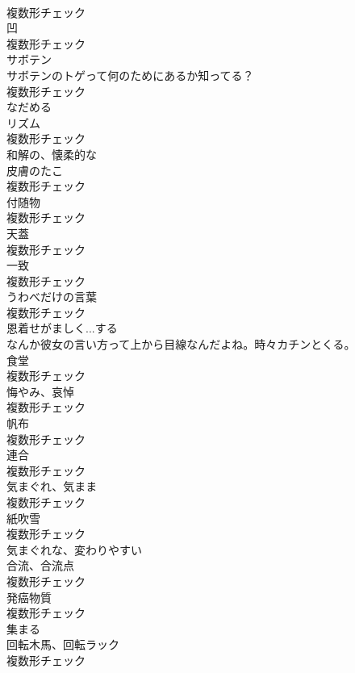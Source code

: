 \documentclass[8pt]{extreport}
\begin{document}
\begin{CJK}{UTF8}{min}
\\	複数形チェック
\\	[名詞]	凹	
\\	複数形チェック
\\	[名詞]	サボテン	
\\	サボテンのトゲって何のためにあるか知ってる？	
\\	複数形チェック
\\	[動詞]	なだめる	
\\	[名詞]	リズム	
\\	複数形チェック
\\	[形容詞]	和解の、懐柔的な	
\\	[名詞]	皮膚のたこ	
\\	複数形チェック
\\	[名詞]	付随物	
\\	複数形チェック
\\	[名詞]	天蓋	
\\	複数形チェック
\\	[名詞]	一致	
\\	複数形チェック
\\	[名詞]	うわべだけの言葉	
\\	複数形チェック
\\	[動詞]	恩着せがましく...する	
\\	なんか彼女の言い方って上から目線なんだよね。時々カチンとくる。	
\\	[名詞]	食堂	
\\	複数形チェック
\\	[名詞]	悔やみ、哀悼	
\\	複数形チェック
\\	[名詞]	帆布	
\\	複数形チェック
\\	[名詞]	連合	
\\	複数形チェック
\\	[名詞]	気まぐれ、気まま	
\\	複数形チェック
\\	[名詞]	紙吹雪	
\\	複数形チェック
\\	[形容詞]	気まぐれな、変わりやすい	
\\	[名詞]	合流、合流点	
\\	複数形チェック
\\	[名詞]	発癌物質	
\\	複数形チェック
\\	[動詞]	集まる	
\\	[名詞]	回転木馬、回転ラック	
\\	複数形チェック

\end{CJK}
\end{document}
